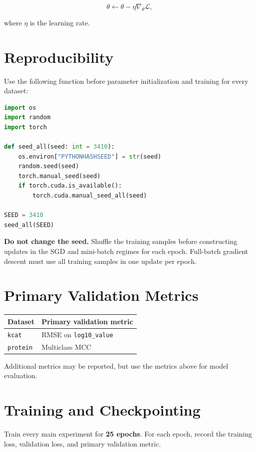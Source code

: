 \documentclass[11pt,a4paper]{article}
\newcommand{\code}[1]{\texttt{#1}}
\begin{document}
\[
\theta \leftarrow \theta-\eta\nabla_{\theta}\mathcal{L},
\]

where $\eta$ is the learning rate.

\section{Reproducibility}

Use the following function before parameter initialization and training for every dataset:

\begin{lstlisting}[language=Python]
import os
import random
import torch

def seed_all(seed: int = 3410):
    os.environ["PYTHONHASHSEED"] = str(seed)
    random.seed(seed)
    torch.manual_seed(seed)
    if torch.cuda.is_available():
        torch.cuda.manual_seed_all(seed)

SEED = 3410
seed_all(SEED)
\end{lstlisting}

\textbf{Do not change the seed.} Shuffle the training samples before constructing updates in the SGD and mini-batch regimes for each epoch. Full-batch gradient descent must use all training samples in one update per epoch.

\section{Primary Validation Metrics}

\begin{center}
\begin{tabular}{ll}
\toprule
\textbf{Dataset} & \textbf{Primary validation metric} \\
\midrule
\code{kcat} & RMSE on \code{log10\_value} \\
\code{protein} & Multiclass MCC \\
\bottomrule
\end{tabular}
\end{center}

Additional metrics may be reported, but use the metrics above for model evaluation.

\section{Training and Checkpointing}

Train every main experiment for \textbf{25 epochs}. For each epoch, record the training loss, validation loss, and primary validation metric.
\end{document}

